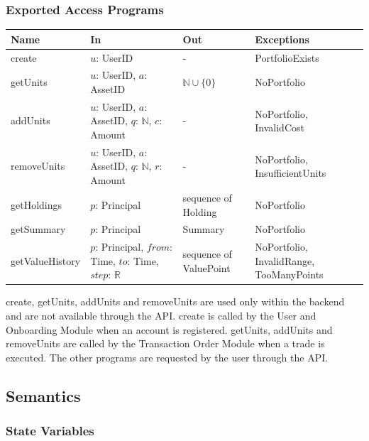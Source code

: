 \documentclass[12pt, titlepage]{article}
\begin{document}
\subsubsection{Exported Access Programs}

\begin{center}
\renewcommand{\arraystretch}{1.2}
\begin{tabular}{>{\raggedright\arraybackslash}p{3cm}
  >{\raggedright\arraybackslash}p{5cm}
  >{\raggedright\arraybackslash}p{2.6cm}
  >{\raggedright\arraybackslash}p{3.4cm}}
\toprule
\textbf{Name} & \textbf{In} & \textbf{Out} & \textbf{Exceptions} \\
\midrule
create & $u$: UserID & - & PortfolioExists \\
getUnits & $u$: UserID, $a$: AssetID & $\mathbb{N} \cup \{0\}$ &
  NoPortfolio \\
addUnits & $u$: UserID, $a$: AssetID, $q$: $\mathbb{N}$, $c$: Amount & - &
  NoPortfolio, InvalidCost \\
removeUnits & $u$: UserID, $a$: AssetID, $q$: $\mathbb{N}$, $r$: Amount & -
  & NoPortfolio, InsufficientUnits \\
getHoldings & $p$: Principal & sequence of Holding & NoPortfolio \\
getSummary & $p$: Principal & Summary & NoPortfolio \\
getValueHistory & $p$: Principal, $\mathit{from}$: Time, $\mathit{to}$:
  Time, $\mathit{step}$: $\mathbb{R}$ & sequence of ValuePoint & NoPortfolio,
  InvalidRange, TooManyPoints \\
\bottomrule
\end{tabular}
\end{center}

\noindent create, getUnits, addUnits and removeUnits are used only within the
backend and are not available through the API. create is called by the User
and Onboarding Module when an account is registered. getUnits, addUnits and
removeUnits are called by the Transaction Order Module when a trade is
executed. The other programs are requested by the user through the API.

\subsection{Semantics}

\subsubsection{State Variables}
\end{document}
